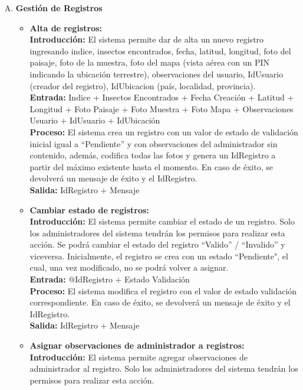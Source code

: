 \begin{enumerate}[A.]
      \item \textbf{Gestión de Registros}
        \begin{itemize}
          \item \textbf{Alta de registros:}
            \\ \textbf{Introducción:} El sistema permite dar de alta un nuevo registro ingresando indice, insectos encontrados, fecha, latitud, longitud, foto del paisaje, foto de la muestra, foto del mapa (vista aérea con un PIN indicando la ubicación terrestre), observaciones del usuario, IdUsuario (creador del registro), IdUbicacion (país, localidad, provincia).
            \\ \textbf{Entrada:} Indice + Insectos Encontrados + Fecha Creación + Latitud + Longitud + Foto Paisaje + Foto Muestra + Foto Mapa + Observaciones Usuario + IdUsuario + IdUbicación
            \\ \textbf{Proceso:} El sistema crea un registro con un valor de estado de validación inicial igual a ``Pendiente'' y con observaciones del administrador sin contenido, además, codifica todas las fotos y genera un IdRegistro a partir del máximo existente hasta el momento. En caso de éxito, se devolverá un mensaje de éxito y el IdRegistro.
            \\ \textbf{Salida:} IdRegistro + Mensaje
            \\
          \item \textbf{Cambiar estado de registros:}
            \\ \textbf{Introducción:} El sistema permite cambiar el estado de un registro. Solo los administradores del sistema tendrán los permisos para realizar esta acción. Se podrá cambiar el estado del registro ``Valido'' / ``Invalido'' y viceversa. Inicialmente, el registro se crea con un estado ``Pendiente", el cual, una vez modificado, no se podrá volver a asignar.
            \\ \textbf{Entrada:} @IdRegistro + Estado Validación
            \\ \textbf{Proceso:} El sistema modifica el registro con el valor de estado validación correspondiente. En caso de éxito, se devolverá un mensaje de éxito y el IdRegistro.
            \\ \textbf{Salida:} IdRegistro + Mensaje
            \\
          \item \textbf{Asignar observaciones de administrador a registros:}
            \\ \textbf{Introducción:} El sistema permite agregar observaciones de administrador al registro. Solo los administradores del sistema tendrán los permisos para realizar esta acción.

\end{itemize}
\end{enumerate}
